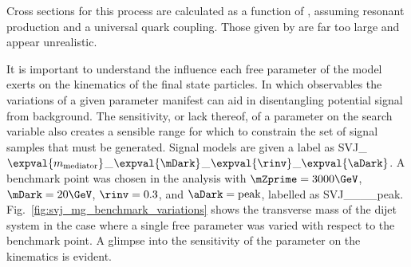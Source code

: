 Cross sections for this process are calculated as a function of \mZprime, assuming resonant production and a universal quark coupling. Those given by \MADGRAPH are far too large and appear unrealistic. %

It is important to understand the influence each free parameter of the model exerts on the kinematics of the final state particles. In which observables the variations of a given parameter manifest can aid in disentangling potential signal from background. The sensitivity, or lack thereof, of a parameter on the search variable also creates a sensible range for which to constrain the set of signal samples that must be generated. Signal models are given a label as SVJ\_\-$\expval{m_{\mathrm{mediator}}}$\_\-$\expval{\mDark}$\_\-$\expval{\rinv}$\_\-$\expval{\aDark}$. A benchmark point was chosen in the analysis with $\mZprime = \text{3000}\GeV$, $\mDark = \text{20}\GeV$, $\rinv = \text{0.3}$, and $\aDark = \text{peak}$, labelled as SVJ\_\_\_\_\-peak. Fig.~\ref{fig:svj_mg_benchmark_variations} shows the transverse mass of the dijet system \mT in the case where a single free parameter was varied with respect to the benchmark point. A glimpse into the sensitivity of the parameter on the kinematics is evident.

